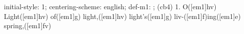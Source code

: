 initial-style: 1;
centering-scheme: english;
def-m1: \grealign;
(cb4) 1. O([em1]hv) Light([em1]hv) of([em1]g) light,([em1]hv) light's([em1]g) liv-([em1]f)ing([em1]e) spring,([em1]fv)